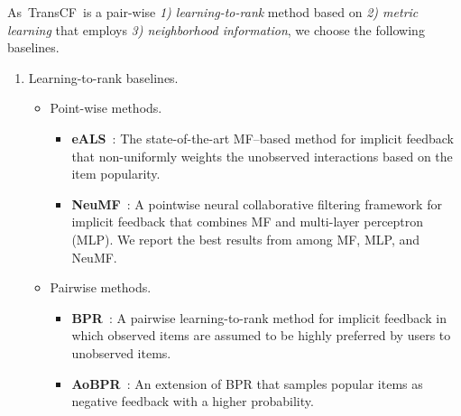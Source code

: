 \documentclass[conference]{IEEEtran}
\newcommand{\propose}{\textsf{{TransCF}}}
\begin{document}
\medskip
{}
As~\propose~is a pair-wise \textit{1) learning-to-rank} method based on \textit{2) metric learning} that employs \textit{3) neighborhood information}, we choose the following baselines.
\begin{enumerate}[leftmargin=0.5cm]
	\item Learning-to-rank baselines.
\begin{itemize}
		\item Point-wise methods.
		\begin{itemize}
			\item \textbf{eALS}~\cite{he2016fast}: The state-of-the-art MF--based method for implicit feedback that non-uniformly weights the unobserved interactions based on the item popularity.
			\item \textbf{NeuMF}~\cite{he2017neural}: A pointwise neural collaborative filtering framework for implicit feedback that combines MF and multi-layer perceptron (MLP). We report the best results from among MF, MLP, and NeuMF.
		\end{itemize}
		\item Pairwise methods.
		\begin{itemize}
			\item \textbf{BPR}~\cite{rendle2009bpr}: A pairwise learning-to-rank method for implicit feedback in which observed items are assumed to be highly preferred by users to unobserved items.
			\item \textbf{AoBPR}~\cite{rendle2014improving}: An extension of BPR that samples popular items as negative feedback with a higher probability.
		\end{itemize}
	\end{itemize}
	

\end{enumerate}
\end{document}
